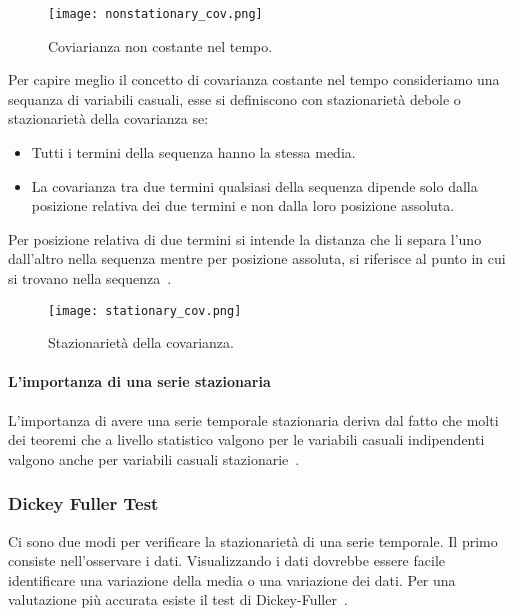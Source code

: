 \begin{enumerate}
    \begin{figure}[H]
        \centering
        \texttt{[image: nonstationary\_cov.png]}
        \caption{Coviarianza non costante nel tempo.}
        \label{fig:nons_cov}
    \end{figure}

    Per capire meglio il concetto di covarianza costante nel tempo 
    consideriamo una sequanza di variabili casuali, esse si definiscono
    con stazionarietà debole o stazionarietà della covarianza se:

    \begin{itemize}
        \setlength\itemsep{-0.6em}
        \item Tutti i termini della sequenza hanno la stessa media.
        \item La covarianza tra due termini qualsiasi della sequenza 
        dipende solo dalla posizione relativa dei due termini e non dalla 
        loro posizione assoluta.
    \end{itemize}

    Per posizione relativa di due termini si intende la distanza che 
    li separa l'uno dall'altro nella sequenza mentre per posizione assoluta, 
    si riferisce al punto in cui si trovano nella sequenza~\cite{sl:cov_stat}.

    \begin{figure}[H]
        \centering
        \texttt{[image: stationary\_cov.png]}
        \caption{Stazionarietà della covarianza.}
    \end{figure}

\end{enumerate}

\paragraph{L'importanza di una serie stazionaria} 
L'importanza di avere una serie temporale stazionaria deriva dal fatto che 
molti dei teoremi che a livello statistico valgono per le variabili casuali indipendenti
valgono anche per variabili casuali stazionarie~\cite{sa:stationary}.


\subsubsection{Dickey Fuller Test}
Ci sono due modi per verificare la stazionarietà di una serie temporale. 
Il primo consiste nell'osservare i dati. Visualizzando i dati dovrebbe essere 
facile identificare una variazione della media o una variazione dei dati. 
Per una valutazione più accurata esiste il test di Dickey-Fuller~\cite{sa:stationary}.

